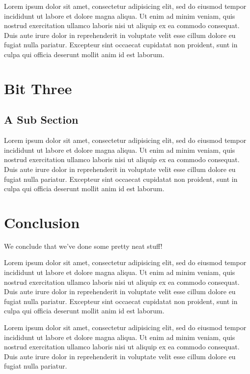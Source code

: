 \documentclass[a0,landscape]{a0poster}
\begin{document}
Lorem ipsum dolor sit amet, consectetur adipisicing elit, sed do eiusmod
tempor incididunt ut labore et dolore magna aliqua. Ut enim ad minim
veniam, quis nostrud exercitation ullamco laboris nisi ut aliquip ex ea
commodo consequat. Duis aute irure dolor in reprehenderit in voluptate
velit esse cillum dolore eu fugiat nulla pariatur. Excepteur sint occaecat
cupidatat non proident, sunt in culpa qui officia deserunt mollit anim
id est laborum.

\section{Bit Three}

\subsection{A Sub Section}

Lorem ipsum dolor sit amet, consectetur adipisicing elit, sed do eiusmod
tempor incididunt ut labore et dolore magna aliqua. Ut enim ad minim
veniam, quis nostrud exercitation ullamco laboris nisi ut aliquip ex ea
commodo consequat. Duis aute irure dolor in reprehenderit in voluptate
velit esse cillum dolore eu fugiat nulla pariatur. Excepteur sint occaecat
cupidatat non proident, sunt in culpa qui officia deserunt mollit anim
id est laborum.

\section{Conclusion}

We conclude that we've done some pretty neat stuff!

Lorem ipsum dolor sit amet, consectetur adipisicing elit, sed do eiusmod
tempor incididunt ut labore et dolore magna aliqua. Ut enim ad minim
veniam, quis nostrud exercitation ullamco laboris nisi ut aliquip ex ea
commodo consequat. Duis aute irure dolor in reprehenderit in voluptate
velit esse cillum dolore eu fugiat nulla pariatur. Excepteur sint occaecat
cupidatat non proident, sunt in culpa qui officia deserunt mollit anim
id est laborum.

Lorem ipsum dolor sit amet, consectetur adipisicing elit, sed do
eiusmod tempor incididunt ut labore et dolore magna aliqua. Ut enim
ad minim veniam, quis nostrud exercitation ullamco laboris nisi ut
aliquip ex ea commodo consequat. Duis aute irure dolor in
reprehenderit in voluptate velit esse cillum dolore eu fugiat nulla
pariatur.
\end{document}

